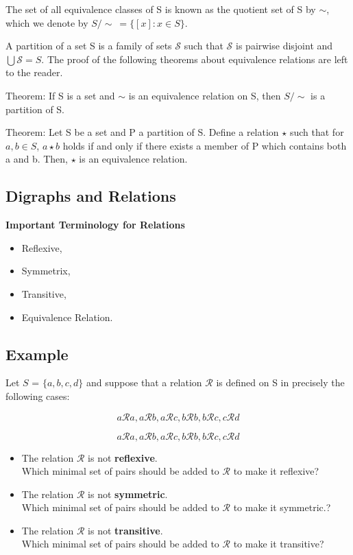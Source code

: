 \documentclass[]{report}
\begin{document}
The set of all equivalence classes of S is known as the quotient set of S by $\sim$, which we denote by $S/\!\sim\ = \{[x] : x \in S\}$.

A partition of a set S is a family of sets $\mathcal{S}$ such that $\mathcal{S}$ is pairwise disjoint and $\bigcup \mathcal{S} = S$. The proof of the following theorems about equivalence relations are left to the reader.

Theorem: If S is a set and $\sim$ is an equivalence relation on S, then $S/\!\sim$ is a partition of S.

Theorem: Let S be a set and P a partition of S. Define a relation $\star$ such that for $a, b \in S$, $a \star b$ holds if and only if there exists a member of P which contains both a and b. Then, $\star$ is an equivalence relation.

\newpage

\subsection{Digraphs and Relations}
\textbf{Important Terminology for Relations}
\begin{itemize}
\item Reflexive,
\item Symmetrix,
\item Transitive,
\item Equivalence Relation.
\end{itemize}

\subsection{Example}
Let $S$ = $\{ a,b,c,d \}$ and suppose that a relation $\mathcal{R}$ is defined on S in precisely the following cases:

\[ a\mathcal{R}a , a\mathcal{R}b , a\mathcal{R}c , b\mathcal{R}b, b\mathcal{R}c , c\mathcal{R}d  \]




\[ a\mathcal{R}a , a\mathcal{R}b , a\mathcal{R}c , b\mathcal{R}b, b\mathcal{R}c , c\mathcal{R}d  \]

\begin{itemize}
    \item The relation $\mathcal{R}$ is not \textbf{reflexive}. \\ \bigskip Which minimal set of pairs should be added to  $\mathcal{R}$  to make it reflexive?


\item The relation $\mathcal{R}$ is not \textbf{symmetric}. \\\bigskip Which minimal set of pairs should be added to  $\mathcal{R}$  to make it symmetric.?


\item The relation $\mathcal{R}$ is not \textbf{transitive}. \\ \bigskip Which minimal set of pairs should be added to  $\mathcal{R}$  to make it transitive?
\end{itemize}
\end{document}
